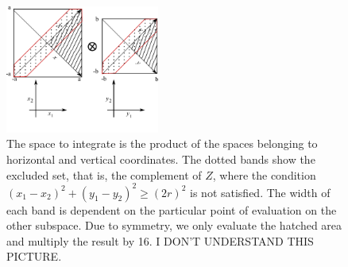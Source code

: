 \documentclass[superscriptaddress,pre,reprint,showpacs,onecolumn]{revtex4-1}
\begin{document}
\begin{figure}[h]
  \begin{center}
    \includegraphics[width=0.45\textwidth]{figures/diagramintegra01.pdf}
  \end{center}
  \caption{The space to integrate is the product of the spaces
    belonging to horizontal and vertical coordinates. The dotted
    bands show the excluded set, that is, the complement of $Z$, where the condition 
    $ (x_1-x_2)^2 + (y_1-y_2)^2 \ge (2r)^2 $ is not satisfied.
    The width of each band is dependent on the particular 
    point of evaluation
    on the other subspace. Due to 
    symmetry, we only evaluate the hatched area and
    multiply the result by 16. I DON'T UNDERSTAND THIS PICTURE.
    \label{diagintegral01}  
    }
\end{figure}
\end{document}
